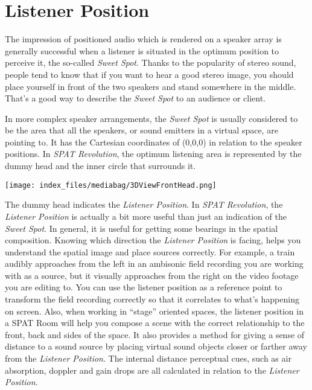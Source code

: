 \documentclass[
  letterpaper,
  DIV=11,
  numbers=noendperiod]{scrreport}
\begin{document}
\hypertarget{listener-position}{%
\chapter{Listener Position}\label{listener-position}}

The impression of positioned audio which is rendered on a speaker array
is generally successful when a listener is situated in the optimum
position to perceive it, the so-called \emph{Sweet Spot}. Thanks to the
popularity of stereo sound, people tend to know that if you want to hear
a good stereo image, you should place yourself in front of the two
speakers and stand somewhere in the middle. That's a good way to
describe the \emph{Sweet Spot} to an audience or client.

In more complex speaker arrangements, the \emph{Sweet Spot} is usually
considered to be the area that all the speakers, or sound emitters in a
virtual space, are pointing to. It has the Cartesian coordinates of
(0,0,0) in relation to the speaker positions. In \emph{SPAT Revolution},
the optimum listening area is represented by the dummy head and the
inner circle that surrounds it.

\texttt{[image: index\_files/mediabag/3DViewFrontHead.png]}

The dummy head indicates the \emph{Listener Position}. In \emph{SPAT
Revolution}, the \emph{Listener Position} is actually a bit more useful
than just an indication of the \emph{Sweet Spot}. In general, it is
useful for getting some bearings in the spatial composition. Knowing
which direction the \emph{Listener Position} is facing, helps you
understand the spatial image and place sources correctly. For example, a
train audibly approaches from the left in an ambisonic field recording
you are working with as a source, but it visually approaches from the
right on the video footage you are editing to. You can use the listener
position as a reference point to transform the field recording correctly
so that it correlates to what's happening on screen. Also, when working
in ``stage'' oriented spaces, the listener position in a SPAT Room will
help you compose a scene with the correct relationship to the front,
back and sides of the space. It also provides a method for giving a
sense of distance to a sound source by placing virtual sound objects
closer or farther away from the \emph{Listener Position}. The internal
distance perceptual cues, such as air absorption, doppler and gain drops
are all calculated in relation to the \emph{Listener Position}.
\end{document}
